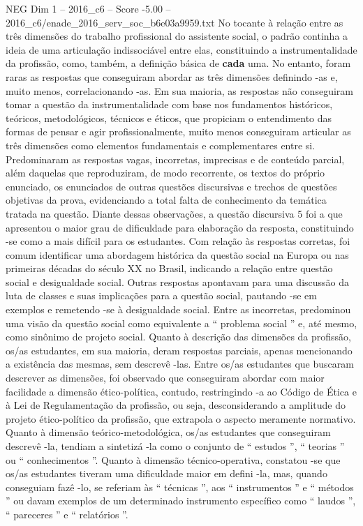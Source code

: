 \begin{textsample}{NEG Dim 1 – 2016\_c6 – Score -5.00 – 2016\_c6/enade\_2016\_serv\_soc\_b6e03a9959.txt}
No tocante à relação entre as três dimensões do trabalho profissional do assistente social, o padrão continha a ideia de uma articulação indissociável entre elas, constituindo a instrumentalidade da profissão, como, também, a definição básica de \textbf{cada} uma.
No entanto, foram raras as respostas que conseguiram abordar as três dimensões definindo -as e, muito menos, correlacionando -as.
Em sua maioria, as respostas não conseguiram tomar a questão da instrumentalidade com base nos fundamentos históricos, teóricos, metodológicos, técnicos e éticos, que propiciam o entendimento das formas de pensar e agir profissionalmente, muito menos conseguiram articular as três dimensões como elementos fundamentais e complementares entre si.
Predominaram as respostas vagas, incorretas, imprecisas e de conteúdo parcial, além daquelas que reproduziram, de modo recorrente, os textos do próprio enunciado, os enunciados de outras questões discursivas e trechos de questões objetivas da prova, evidenciando a total falta de conhecimento da temática tratada na questão.
Diante dessas observações, a questão discursiva 5 foi a que apresentou o maior grau de dificuldade para elaboração da resposta, constituindo -se como a mais difícil para os estudantes.
Com relação às respostas corretas, foi comum identificar uma abordagem histórica da questão social na Europa ou nas primeiras décadas do século XX no Brasil, indicando a relação entre questão social e desigualdade social.
Outras respostas apontavam para uma discussão da luta de classes e suas implicações para a questão social, pautando -se em exemplos e remetendo -se à desigualdade social.
Entre as incorretas, predominou uma visão da questão social como equivalente a “ problema social ” e, até mesmo, como sinônimo de projeto social.
Quanto à descrição das dimensões da profissão, os/as estudantes, em sua maioria, deram respostas parciais, apenas mencionando a existência das mesmas, sem descrevê -las.
Entre os/as estudantes que buscaram descrever as dimensões, foi observado que conseguiram abordar com maior facilidade a dimensão ético-política, contudo, restringindo -a ao Código de Ética e à Lei de Regulamentação da profissão, ou seja, desconsiderando a amplitude do projeto ético-político da profissão, que extrapola o aspecto meramente normativo.
Quanto à dimensão teórico-metodológica, os/as estudantes que conseguiram descrevê -la, tendiam a sintetizá -la como o conjunto de “ estudos ”, “ teorias ” ou “ conhecimentos ”.
Quanto à dimensão técnico-operativa, constatou -se que os/as estudantes tiveram uma dificuldade maior em defini -la, mas, quando conseguiam fazê -lo, se referiam às “ técnicas ”, aos “ instrumentos ” e “ métodos ” ou davam exemplos de um determinado instrumento específico como “ laudos ”, “ pareceres ” e “ relatórios ”.

\end{textsample}
